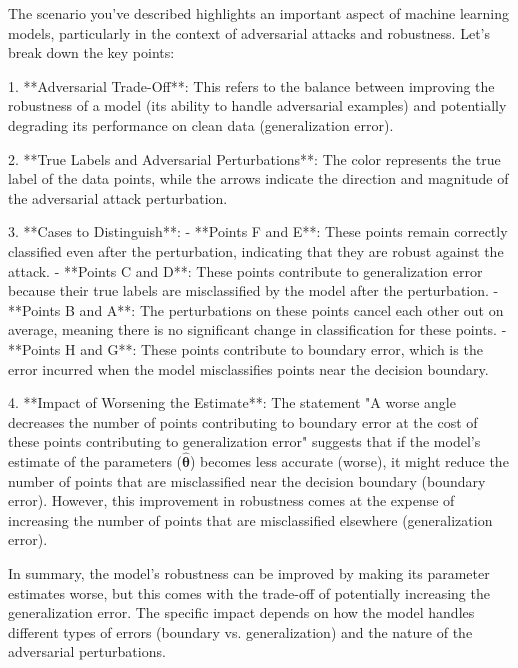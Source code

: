 The scenario you've described highlights an important aspect of machine learning models, particularly in the context of adversarial attacks and robustness. Let's break down the key points:

1. **Adversarial Trade-Off**: This refers to the balance between improving the robustness of a model (its ability to handle adversarial examples) and potentially degrading its performance on clean data (generalization error).

2. **True Labels and Adversarial Perturbations**: The color represents the true label of the data points, while the arrows indicate the direction and magnitude of the adversarial attack perturbation.

3. **Cases to Distinguish**:
   - **Points F and E**: These points remain correctly classified even after the perturbation, indicating that they are robust against the attack.
   - **Points C and D**: These points contribute to generalization error because their true labels are misclassified by the model after the perturbation.
   - **Points B and A**: The perturbations on these points cancel each other out on average, meaning there is no significant change in classification for these points.
   - **Points H and G**: These points contribute to boundary error, which is the error incurred when the model misclassifies points near the decision boundary.

4. **Impact of Worsening the Estimate**: The statement "A worse angle decreases the number of points contributing to boundary error at the cost of these points contributing to generalization error" suggests that if the model's estimate of the parameters (\(\hat{\boldsymbol{\theta}}\)) becomes less accurate (worse), it might reduce the number of points that are misclassified near the decision boundary (boundary error). However, this improvement in robustness comes at the expense of increasing the number of points that are misclassified elsewhere (generalization error).

In summary, the model's robustness can be improved by making its parameter estimates worse, but this comes with the trade-off of potentially increasing the generalization error. The specific impact depends on how the model handles different types of errors (boundary vs. generalization) and the nature of the adversarial perturbations.